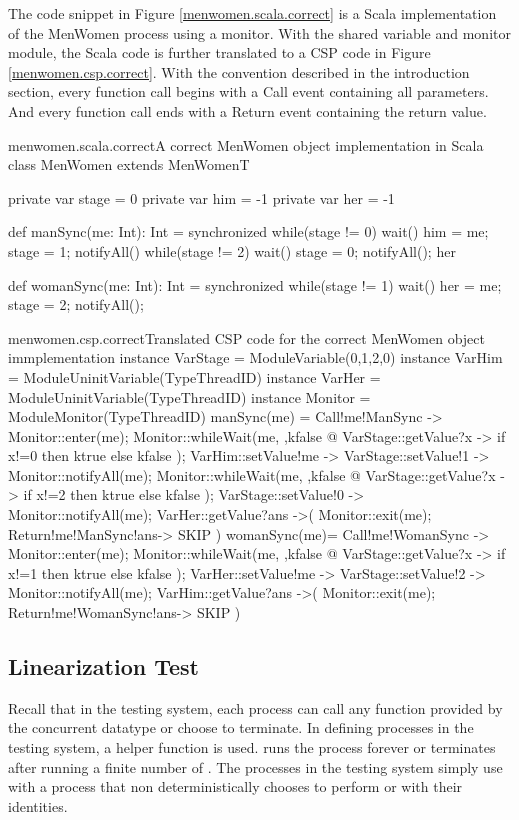 \documentclass[a4paper, 12pt]{article}
\begin{document}
The code snippet in Figure \ref{menwomen.scala.correct} is a Scala implementation of the MenWomen process using a monitor. With the shared variable and monitor module, the Scala code is further translated to a CSP code in Figure \ref{menwomen.csp.correct}. With the convention described in the introduction section, every function call begins with a Call event containing all parameters. And every function call ends with a Return event containing the return value.

\begin{scalafloat}{menwomen.scala.correct}{A correct MenWomen object implementation in Scala}
class MenWomen extends MenWomenT{
  private var stage = 0
  private var him = -1
  private var her = -1

  def manSync(me: Int): Int = synchronized{
    while(stage != 0) wait()         
    him = me; stage = 1; notifyAll() 
    while(stage != 2) wait()
    stage = 0; notifyAll(); her
  }

  def womanSync(me: Int): Int = synchronized{
    while(stage != 1) wait()
    her = me; stage = 2; notifyAll();
  }
}
\end{scalafloat}

\begin{cspfloat}{menwomen.csp.correct}{Translated CSP code for the correct MenWomen object immplementation}
instance VarStage = ModuleVariable({0,1,2},0) 
instance VarHim = ModuleUninitVariable(TypeThreadID)
instance VarHer = ModuleUninitVariable(TypeThreadID)
instance Monitor = ModuleMonitor(TypeThreadID)
manSync(me) = 
  Call!me!ManSync ->
  Monitor::enter(me);
    Monitor::whileWait(me, \ktrue,kfalse @
      VarStage::getValue?x ->
      if x!=0 then ktrue else kfalse
    );
    VarHim::setValue!me ->
    VarStage::setValue!1 ->
    Monitor::notifyAll(me);
    Monitor::whileWait(me, \ktrue,kfalse @
      VarStage::getValue?x ->
      if x!=2 then ktrue else kfalse
    );
    VarStage::setValue!0 ->
    Monitor::notifyAll(me);
    VarHer::getValue?ans ->(
  Monitor::exit(me);
  Return!me!ManSync!ans->
  SKIP
  )
womanSync(me)=
  Call!me!WomanSync ->
  Monitor::enter(me);
    Monitor::whileWait(me, \ktrue,kfalse @
      VarStage::getValue?x ->
      if x!=1 then ktrue else kfalse
    );
    VarHer::setValue!me ->
    VarStage::setValue!2 ->
    Monitor::notifyAll(me);
    VarHim::getValue?ans ->(
  Monitor::exit(me);
  Return!me!WomanSync!ans->
  SKIP
  )
\end{cspfloat}


\subsection{Linearization Test}
Recall that in the testing system, each process can call any function provided by the concurrent datatype or choose to terminate. In defining processes in the testing system, a helper function is used.  runs the process  forever or terminates after running a finite number of . The processes in the testing system simply use  with a process that non deterministically chooses to perform  or  with their identities. 
\end{document}
